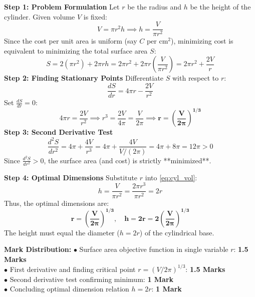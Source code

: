 \begin{solutionbox}
\textbf{Step 1: Problem Formulation}
Let $r$ be the radius and $h$ be the height of the cylinder.
Given volume $V$ is fixed:
\[
V = \pi r^2 h \implies h = \frac{V}{\pi r^2} \label{eq:cyl_vol}
\]
Since the cost per unit area is uniform (say $C$ per $\text{cm}^2$), minimizing cost is equivalent to minimizing the total surface area $S$:
\[
S = 2(\pi r^2) + 2\pi r h = 2\pi r^2 + 2\pi r \left(\frac{V}{\pi r^2}\right) = 2\pi r^2 + \frac{2V}{r}
\]
\textbf{Step 2: Finding Stationary Points}
Differentiate $S$ with respect to $r$:
\[
\frac{dS}{dr} = 4\pi r - \frac{2V}{r^2}
\]
Set $\frac{dS}{dr} = 0$:
\[
4\pi r = \frac{2V}{r^2} \implies r^3 = \frac{2V}{4\pi} = \frac{V}{2\pi} \implies \mathbf{r = \left(\frac{V}{2\pi}\right)^{1/3}}
\]
\textbf{Step 3: Second Derivative Test}
\[
\frac{d^2 S}{dr^2} = 4\pi + \frac{4V}{r^3} = 4\pi + \frac{4V}{V/(2\pi)} = 4\pi + 8\pi = 12\pi > 0
\]
Since $\frac{d^2S}{dr^2} > 0$, the surface area (and cost) is strictly **minimized**.

\textbf{Step 4: Optimal Dimensions}
Substitute $r$ into \eqref{eq:cyl_vol}:
\[
h = \frac{V}{\pi r^2} = \frac{2\pi r^3}{\pi r^2} = 2r
\]
Thus, the optimal dimensions are:
\[
\mathbf{r = \left(\frac{V}{2\pi}\right)^{1/3}, \quad h = 2r = 2\left(\frac{V}{2\pi}\right)^{1/3}}
\]
The height must equal the diameter ($h = 2r$) of the cylindrical base.

\begin{markingrubric}
\textbf{Mark Distribution:}
$\bullet$ Surface area objective function in single variable $r$: \textbf{1.5 Marks}\\
$\bullet$ First derivative and finding critical point $r = (V/2\pi)^{1/3}$: \textbf{1.5 Marks}\\
$\bullet$ Second derivative test confirming minimum: \textbf{1 Mark}\\
$\bullet$ Concluding optimal dimension relation $h = 2r$: \textbf{1 Mark}
\end{markingrubric}
\end{solutionbox}

